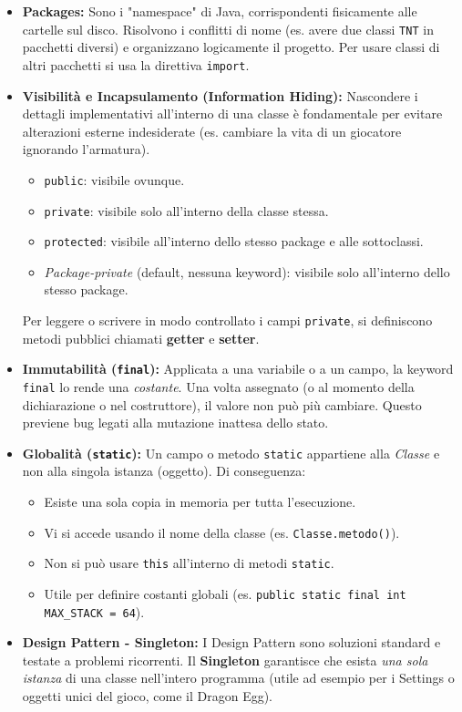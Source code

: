 \documentclass[12pt, a4paper]{article}
\begin{document}
\begin{itemize}
    \item \textbf{Packages:} Sono i "namespace" di Java, corrispondenti fisicamente alle cartelle sul disco. Risolvono i conflitti di nome (es. avere due classi \texttt{TNT} in pacchetti diversi) e organizzano logicamente il progetto. Per usare classi di altri pacchetti si usa la direttiva \texttt{import}.
    
    \item \textbf{Visibilità e Incapsulamento (Information Hiding):}
    Nascondere i dettagli implementativi all'interno di una classe è fondamentale per evitare alterazioni esterne indesiderate (es. cambiare la vita di un giocatore ignorando l'armatura).
    \begin{itemize}
        \item \texttt{public}: visibile ovunque.
        \item \texttt{private}: visibile solo all'interno della classe stessa.
        \item \texttt{protected}: visibile all'interno dello stesso package e alle sottoclassi.
        \item \textit{Package-private} (default, nessuna keyword): visibile solo all'interno dello stesso package.
    \end{itemize}
    Per leggere o scrivere in modo controllato i campi \texttt{private}, si definiscono metodi pubblici chiamati \textbf{getter} e \textbf{setter}.

    \item \textbf{Immutabilità (\texttt{final}):} Applicata a una variabile o a un campo, la keyword \texttt{final} lo rende una \textit{costante}. Una volta assegnato (o al momento della dichiarazione o nel costruttore), il valore non può più cambiare. Questo previene bug legati alla mutazione inattesa dello stato.

    \item \textbf{Globalità (\texttt{static}):} Un campo o metodo \texttt{static} appartiene alla \textit{Classe} e non alla singola istanza (oggetto). Di conseguenza:
    \begin{itemize}
        \item Esiste una sola copia in memoria per tutta l'esecuzione.
        \item Vi si accede usando il nome della classe (es. \texttt{Classe.metodo()}).
        \item Non si può usare \texttt{this} all'interno di metodi \texttt{static}.
        \item Utile per definire costanti globali (es. \texttt{public static final int MAX\_STACK = 64}).
    \end{itemize}

    \item \textbf{Design Pattern - Singleton:} I Design Pattern sono soluzioni standard e testate a problemi ricorrenti. Il \textbf{Singleton} garantisce che esista \textit{una sola istanza} di una classe nell'intero programma (utile ad esempio per i Settings o oggetti unici del gioco, come il Dragon Egg).
\end{itemize}
\end{document}
